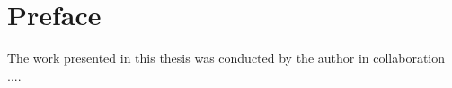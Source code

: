 
\chapter{Preface} 

The work presented in this thesis was conducted by the author in collaboration ....




